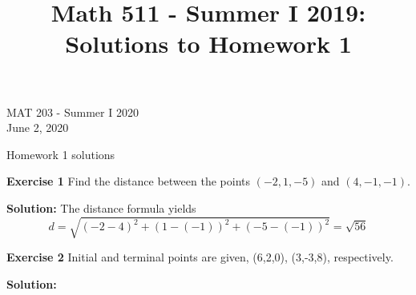 \documentclass[12pt,oneside]{exam}
\title{Math 511 - Summer I 2019: Solutions to Homework 1}
\newenvironment{exercise}[1]{\vspace{.1in}\noindent\textbf{Exercise #1 \hspace{.05em}}}{}
\newenvironment{newsolution}{\vspace{.1in}\noindent\textbf{Solution: \hspace{.05em}}}{}
\begin{document}
\begin{flushright}
\sc MAT 203 - Summer I 2020\\
June 2, 2020
\end{flushright}
\bigskip
 
\begin{center}
\textsf{Homework 1 solutions} 
\end{center}


\begin{exercise}{1}
Find the distance between the points $(-2,1,-5)$ and $(4,-1,-1)$.

\end{exercise}

\begin{newsolution} 
The distance formula yields
\begin{equation*}
d = \sqrt{(-2-4)^2+(1-(-1))^2+(-5-(-1))^2} = \sqrt{56}
\end{equation*}
\end{newsolution}

\begin{exercise}{2}
Initial and terminal points are given, (6,2,0), (3,-3,8), respectively. 
\end{exercise}

\begin{newsolution}
\end{newsolution}
\end{document}
